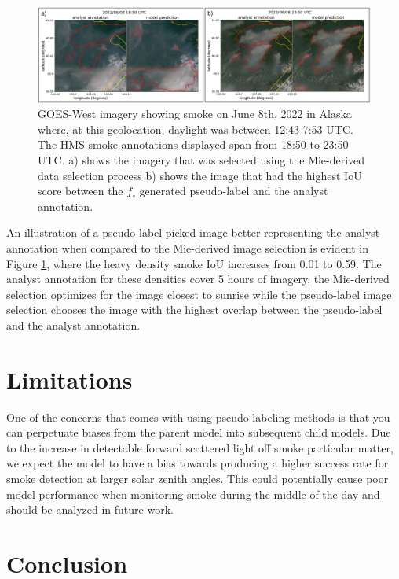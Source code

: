 \documentclass{article}
\begin{document}
\begin{figure}
    \centering
    \includegraphics[width=14cm]{figures/D_m_vs_D_pl.png}
    \caption{GOES-West imagery showing smoke on June 8th, 2022 in Alaska where, at this geolocation, daylight was between 12:43-7:53 UTC. The HMS smoke annotations displayed span from 18:50 to 23:50 UTC. a) shows the imagery that was selected using the Mie-derived data selection process b) shows the image that had the highest IoU score between the \(f_{\circ}\) generated pseudo-label and the analyst annotation.}\label{ml_vs_mei}
\end{figure}

An illustration of a pseudo-label picked image better representing the analyst annotation when compared to the Mie-derived image selection is evident in Figure \ref{ml_vs_mei}, where the heavy density smoke IoU increases from 0.01 to 0.59. The analyst annotation for these densities cover 5 hours of imagery, the Mie-derived selection optimizes for the image closest to sunrise while the pseudo-label image selection chooses the image with the highest overlap between the pseudo-label and the analyst annotation. 

\section{Limitations}

One of the concerns that comes with using pseudo-labeling methods is that you can perpetuate biases from the parent model into subsequent child models. Due to the increase in detectable forward scattered light off smoke particular matter, we expect the model to have a bias towards producing a higher success rate for smoke detection at larger solar zenith angles. This could potentially cause poor model performance when monitoring smoke during the middle of the day and should be analyzed in future work.

\section{Conclusion}
\end{document}
